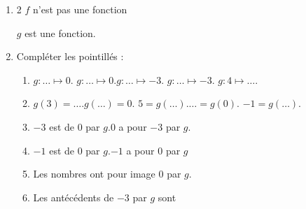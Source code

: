 \documentclass[main.tex]{subfiles}
\begin{document}
\begin{example}
\begin{enumerate}
\begin{minipage}{0.5\columnwidth}
		\end{minipage} 
		\item  \begin{multicols}{2}
			$f$ n'est pas une fonction   
			
			$g$ est une fonction.
		\end{multicols}
		\vfill 
		\item Compléter les pointillés : 
		\begin{enumerate}
			\item    $g\colon \ldots \mapsto 0$. \hfill $g\colon \ldots \mapsto 0$.\hfill $g\colon \ldots \mapsto -3$. \hfill $g\colon \ldots \mapsto -3$. \hfill $g\colon 4 \mapsto \ldots $.
			\item $g(3) = \ldots$.\hfill $g(\ldots)=0$. \hfill $5=g(\ldots)$.\hfill $\ldots=g(0)$. \hfill $-1=g(\ldots)$.
			\item $-3$ est \dotfill de $0$ par $g$.\hfill $0$ a pour \dotfill $-3$  par $g$.
			\item $-1$ est   \dotfill  de $0$  par $g$.\hfill $-1$ a pour \dotfill $0$  par $g$
			\item Les nombres \dotfill ont pour image $0$ par $g$.
			\item Les antécédents de $-3$ par $g$ sont \dotfill 
		\end{enumerate} 
	\end{enumerate} 
\end{example}
\end{document}
